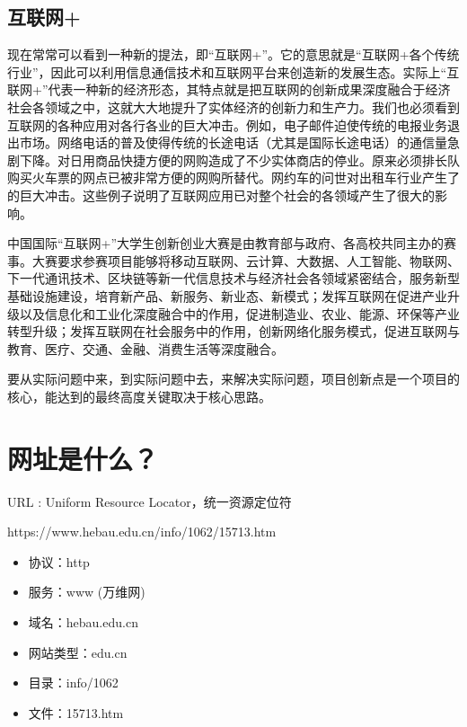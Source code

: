 \subsection{互联网+}
现在常常可以看到一种新的提法，即“互联网+”。它的意思就是“互联网+各个传统行业”，因此可以利用信息通信技术和互联网平台来创造新的发展生态。实际上“互联网+”代表一种新的经济形态，其特点就是把互联网的创新成果深度融合于经济社会各领域之中，这就大大地提升了实体经济的创新力和生产力。我们也必须看到互联网的各种应用对各行各业的巨大冲击。例如，电子邮件迫使传统的电报业务退出市场。网络电话的普及使得传统的长途电话（尤其是国际长途电话）的通信量急剧下降。对日用商品快捷方便的网购造成了不少实体商店的停业。原来必须排长队购买火车票的网点已被非常方便的网购所替代。网约车的问世对出租车行业产生了的巨大冲击。这些例子说明了互联网应用已对整个社会的各领域产生了很大的影响。

中国国际“互联网+”大学生创新创业大赛是由教育部与政府、各高校共同主办的赛事。大赛要求参赛项目能够将移动互联网、云计算、大数据、人工智能、物联网、下一代通讯技术、区块链等新一代信息技术与经济社会各领域紧密结合，服务新型基础设施建设，培育新产品、新服务、新业态、新模式；发挥互联网在促进产业升级以及信息化和工业化深度融合中的作用，促进制造业、农业、能源、环保等产业转型升级；发挥互联网在社会服务中的作用，创新网络化服务模式，促进互联网与教育、医疗、交通、金融、消费生活等深度融合。

要从实际问题中来，到实际问题中去，来解决实际问题，项目创新点是一个项目的核心，能达到的最终高度关键取决于核心思路。

\section{网址是什么？}


{\bfseries {}}

URL : Uniform Resource Locator，统一资源定位符

https://www.hebau.edu.cn/info/1062/15713.htm

\begin{itemize}
    \item 协议：http
    \item 服务：www (万维网)
    \item 域名：hebau.edu.cn
    \item 网站类型：edu.cn
    \item 目录：info/1062
    \item 文件：15713.htm
\end{itemize}

{\bfseries {}}

